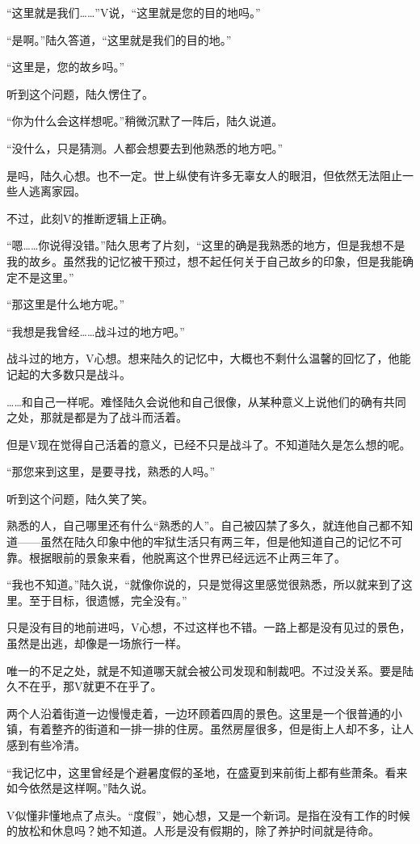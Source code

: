 “这里就是我们……”V说，“这里就是您的目的地吗。”

“是啊。”陆久答道，“这里就是我们的目的地。”

“这里是，您的故乡吗。”

听到这个问题，陆久愣住了。

“你为什么会这样想呢。”稍微沉默了一阵后，陆久说道。

“没什么，只是猜测。人都会想要去到他熟悉的地方吧。”

是吗，陆久心想。也不一定。世上纵使有许多无辜女人的眼泪，但依然无法阻止一些人逃离家园。

不过，此刻V的推断逻辑上正确。

“嗯……你说得没错。”陆久思考了片刻，“这里的确是我熟悉的地方，但是我想不是我的故乡。虽然我的记忆被干预过，想不起任何关于自己故乡的印象，但是我能确定不是这里。”

“那这里是什么地方呢。”

“我想是我曾经……战斗过的地方吧。”

战斗过的地方，V心想。想来陆久的记忆中，大概也不剩什么温馨的回忆了，他能记起的大多数只是战斗。

……和自己一样呢。难怪陆久会说他和自己很像，从某种意义上说他们的确有共同之处，那就是都是为了战斗而活着。

但是V现在觉得自己活着的意义，已经不只是战斗了。不知道陆久是怎么想的呢。

“那您来到这里，是要寻找，熟悉的人吗。”

听到这个问题，陆久笑了笑。

熟悉的人，自己哪里还有什么“熟悉的人”。自己被囚禁了多久，就连他自己都不知道——虽然在陆久印象中他的牢狱生活只有两三年，但是他知道自己的记忆不可靠。根据眼前的景象来看，他脱离这个世界已经远远不止两三年了。

“我也不知道。”陆久说，“就像你说的，只是觉得这里感觉很熟悉，所以就来到了这里。至于目标，很遗憾，完全没有。”

只是没有目的地前进吗，V心想，不过这样也不错。一路上都是没有见过的景色，虽然是出逃，却像是一场旅行一样。

唯一的不足之处，就是不知道哪天就会被公司发现和制裁吧。不过没关系。要是陆久不在乎，那V就更不在乎了。

两个人沿着街道一边慢慢走着，一边环顾着四周的景色。这里是一个很普通的小镇，有着整齐的街道和一排一排的住房。虽然房屋很多，但是街上人却不多，让人感到有些冷清。

“我记忆中，这里曾经是个避暑度假的圣地，在盛夏到来前街上都有些萧条。看来如今依然是这样啊。”陆久说。

V似懂非懂地点了点头。“度假”，她心想，又是一个新词。是指在没有工作的时候的放松和休息吗？她不知道。人形是没有假期的，除了养护时间就是待命。

